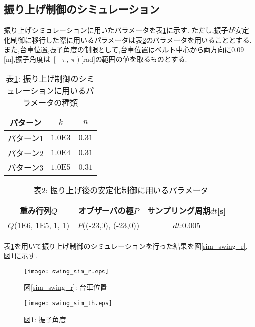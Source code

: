 \subsection{振り上げ制御のシミュレーション}
振り上げシミュレーションに用いたパラメータを表\ref{sim_swing}に示す.
ただし,振子が安定化制御に移行した際に用いるパラメータは表\ref{swing_stable}のパラメータを用いることとする.
また,台車位置,振子角度の制限として,台車位置はベルト中心から両方向に$0.09$[m],振子角度は
$\left[-\pi\right.,\ \left.\pi\right)$[rad]の範囲の値を取るものとする.

\begin{table}[htbp]
    \begin{center}
        \caption{表\ref{sim_swing}: 振り上げ制御のシミュレーションに用いるパラメータの種類}
        \begin{tabular}{|c|c|c|} \hline
            パターン & $k$ & $n$ \\ \hline \hline
            パターン1 & $1.0\mbox{E}3$ & $0.31$ \\ \hline
            パターン2 & $1.0\mbox{E}4$ & $0.31$ \\ \hline
            パターン3 & $1.0\mbox{E}5$ & $0.31$ \\ \hline
        \end{tabular}
        \label{sim_swing}
    \end{center}
\end{table}

\begin{table}[htbp]
    \begin{center}
        \caption{表\ref{swing_stable}: 振り上げ後の安定化制御に用いるパラメータ}
        \begin{tabular}{|c|c|c|c|} \hline
            重み行列$Q$ & オブザーバの極$P$ & サンプリング周期$dt$[s] \\ \hline \hline
            $Q$(1E6, 1E5, 1, 1) & $P$((-23,0), (-23,0)) & $dt$:0.005 \\ \hline
          \end{tabular}
        \label{swing_stable}
    \end{center}
\end{table}

表\ref{sim_swing}を用いて振り上げ制御のシミュレーションを行った結果を図\ref{sim_swing_r},
図\ref{sim_swing_th}に示す.

\begin{figure}[htbp]
    \begin{minipage}{0.5\hsize}
        \begin{center}
            \texttt{[image: swing\_sim\_r.eps]}
            \caption{図\ref{sim_swing_r}: 台車位置}
            \label{sim_swing_r}
        \end{center}
    \end{minipage}
    \begin{minipage}{0.5\hsize}
        \begin{center}
            \texttt{[image: swing\_sim\_th.eps]}
            \caption{図\ref{sim_swing_th}: 振子角度}
            \label{sim_swing_th}
        \end{center}
    \end{minipage}
\end{figure}

